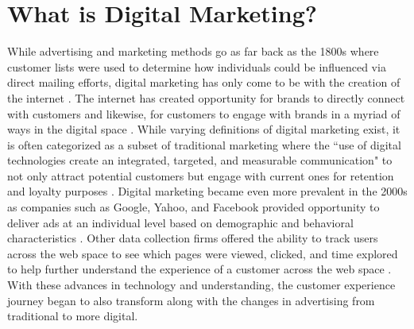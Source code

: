 \documentclass[sigconf]{acmart}
\begin{document}
\section{What is Digital Marketing?}
While advertising and marketing methods go as far back as the 1800s where customer lists were used to determine how individuals could be influenced via direct mailing efforts, digital marketing has only come to be with the creation of the internet \cite{Couldry2014}. The internet has created opportunity for brands to directly connect with customers and likewise, for customers to engage with brands in a myriad of ways in the digital space \cite{Edelman2010}. While varying definitions of digital marketing exist, it is often categorized as a subset of traditional marketing where the ``use of digital technologies create an integrated, targeted, and measurable communication" to not only attract potential customers but engage with current ones for retention and loyalty purposes \cite{Grishikashvili2014}. Digital marketing became even more prevalent in the 2000s as companies such as Google, Yahoo, and Facebook provided opportunity to deliver ads at an individual level based on demographic and behavioral characteristics \cite{Couldry2014}. Other data collection firms offered the ability to track users across the web space to see which pages were viewed, clicked, and time explored to help further understand the experience of a customer across the web space \cite{Couldry2014}. With these advances in technology and understanding, the customer experience journey began to also transform along with the changes in advertising from traditional to more digital.
\end{document}

